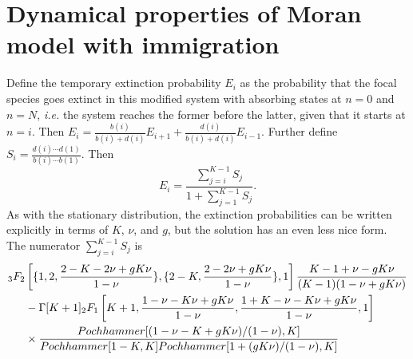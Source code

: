 \section*{Dynamical properties of Moran model with immigration}
Define the temporary extinction probability $E_i$ as the probability that the focal species goes extinct in this modified system with absorbing states at $n=0$ and $n=N$, \emph{i.e.} the system reaches the former before the latter, given that it starts at $n=i$. 
Then $E_i = \frac{b(i)}{b(i)+d(i)}E_{i+1} + \frac{d(i)}{b(i)+d(i)}E_{i-1}$. 
Further define $S_i = \frac{d(i)\cdots d(1)}{b(i)\cdots b(1)}$. 
Then 
\begin{equation}
E_{i} = \frac{\sum_{j=i}^{K-1}S_j}{1+\sum_{j=1}^{K-1}S_j}. 
\end{equation}
As with the stationary distribution, the extinction probabilities can be written explicitly in terms of $K$, $\nu$, and $g$, but the solution has an even less nice form. 
The numerator $\sum_{j=i}^{K-1}S_j$ is
\begin{align}
{}_3F_2&\left[\{1, 2, \frac{2-K-2\nu+g K \nu}{1-\nu}\}, \{2-K, \frac{2-2 \nu+g K \nu}{1-\nu}\}, 1\right]\frac{K-1+\nu-g K \nu}{(K-1) (1 - \nu + g K \nu)} \\
 &- \Gamma[K+1] {}_2F_1\left[K+1, \frac{1-\nu-K \nu+g K \nu}{1-\nu}, \frac{1+K-\nu-K \nu+g K \nu}{1-\nu}, 1\right] \notag \\
 &\times \frac{Pochhammer[(1-\nu-K+g K \nu)/(1-\nu),K]}{Pochhammer[1-K,K] Pochhammer[1+(g K \nu)/(1-\nu),K]} \notag
\end{align}
